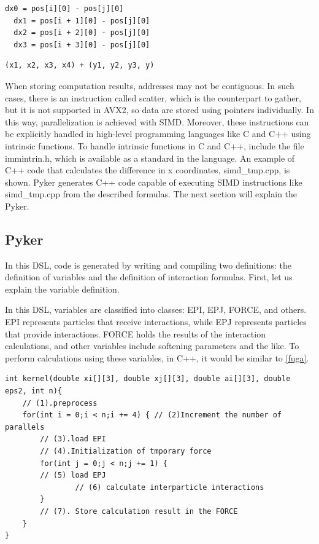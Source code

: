 \documentclass[ams, a4j]{U-AizuGT}
\begin{document}
\begin{lstlisting}[frame=single]
  dx0 = pos[i][0] - pos[j][0]
  dx1 = pos[i + 1][0] - pos[j][0]
  dx2 = pos[i + 2][0] - pos[j][0]
  dx3 = pos[i + 3][0] - pos[j][0]
\end{lstlisting}

\begin{lstlisting}[frame=single]
  (x1, x2, x3, x4) + (y1, y2, y3, y)

\end{lstlisting}


When storing computation results, addresses may 
not be contiguous. In such cases, there is an instruction called scatter, which is the counterpart to gather, but it is not supported 
in AVX2, so data are stored using pointers individually. In this way, parallelization is achieved with SIMD. Moreover, these instructions
can be explicitly handled in high-level programming languages like C and C++ using intrinsic functions. To handle intrinsic functions 
in C and C++, include the file immintrin.h, which is available as a standard in the language. An example of C++ code that calculates the difference in x coordinates, simd\_tmp.cpp, is shown. { Pyker}  generates C++ code capable of executing SIMD instructions like simd\_tmp.cpp
from the described formulas. The next section will explain the Pyker.

\subsection{Pyker}
In this DSL, code is generated by writing and compiling two definitions: the definition of variables and the definition of interaction formulas. First, let us explain the variable definition.


In this DSL, variables are classified into classes: EPI, EPJ, FORCE, and others. EPI represents particles that receive interactions, 
while EPJ represents particles that provide interactions. FORCE holds the results of the interaction calculations, and other variables 
include softening parameters and the like. To perform calculations using these variables, in C++, it would be similar to \ref{fuga}.



\begin{lstlisting}[frame=single, caption=skeleton code, label=fuga]
int kernel(double xi[][3], double xj[][3], double ai[][3], double eps2, int n){
	// (1).preprocess
	for(int i = 0;i < n;i += 4) { // (2)Increment the number of parallels
		// (3).load EPI
		// (4).Initialization of tmporary force
		for(int j = 0;j < n;j += 1) {
        // (5) load EPJ
				// (6) calculate interparticle interactions
		}
		// (7). Store calculation result in the FORCE
	}
}
\end{lstlisting}
\end{document}
